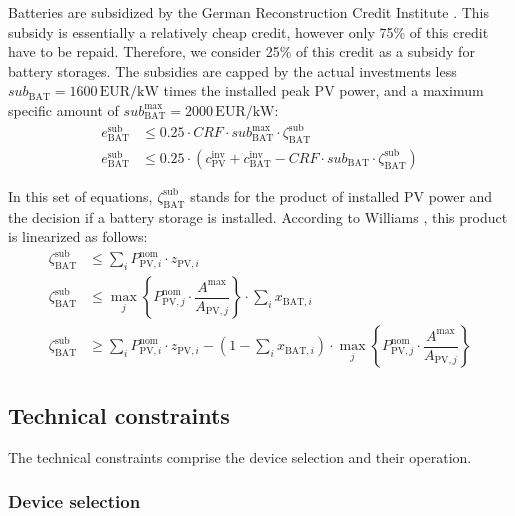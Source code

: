 Batteries are subsidized by the German Reconstruction Credit Institute \cite{KfW275_2016}.
This subsidy is essentially a relatively cheap credit, however only 75\% of this credit have to be repaid.
Therefore, we consider 25\% of this credit as a subsidy for battery storages.
The subsidies are capped by the actual investments less $sub_{\mathrm{BAT}}=1600\,\mathrm{EUR}/\mathrm{kW}$ times the installed peak PV power, and a maximum specific amount of $sub^\mathrm{max}_\mathrm{BAT}=2000\,\mathrm{EUR}/\mathrm{kW}$:
\begin{align}
	e^\mathrm{sub}_{\mathrm{BAT}} &\le 0.25 \cdot CRF \cdot sub^\mathrm{max}_\mathrm{BAT} \cdot \zeta^\mathrm{sub}_{\mathrm{BAT}}\\
	e^\mathrm{sub}_{\mathrm{BAT}} &\le 0.25 \cdot \left(c^\mathrm{inv}_{\mathrm{PV}} + c^\mathrm{inv}_{\mathrm{BAT}} - CRF \cdot sub_{\mathrm{BAT}} \cdot \zeta^\mathrm{sub}_{\mathrm{BAT}} \right) 
\end{align}

In this set of equations, $\zeta^\mathrm{sub}_{\mathrm{BAT}}$ stands for the product of installed PV power and the decision if a battery storage is installed.
According to Williams \cite{Williams2013}, this product is linearized as follows:
\begin{align}
	\zeta^\mathrm{sub}_{\mathrm{BAT}} &\le \sum\limits_{i} P^\mathrm{nom}_{\mathrm{PV},i} \cdot z_{\mathrm{PV,}i}\\
	\zeta^\mathrm{sub}_{\mathrm{BAT}} &\le \max_j\left\lbrace P^\mathrm{nom}_{\mathrm{PV,}j} \cdot \dfrac{A^\mathrm{max}}{A_{\mathrm{PV,}j}} \right\rbrace \cdot \sum\limits_{i} x_{\mathrm{BAT,}i}\\
	\zeta^\mathrm{sub}_{\mathrm{BAT}} &\ge \sum\limits_{i} P^\mathrm{nom}_{\mathrm{PV},i} \cdot z_{\mathrm{PV,}i} - \left(1 - \sum\limits_{i} x_{\mathrm{BAT,}i}\right) \cdot \max_j\left\lbrace P^\mathrm{nom}_{\mathrm{PV,}j} \cdot \dfrac{A^\mathrm{max}}{A_{\mathrm{PV,}j}} \right\rbrace
\end{align}

\subsection{Technical constraints}

The technical constraints comprise the device selection and their operation.

\subsubsection{Device selection}

